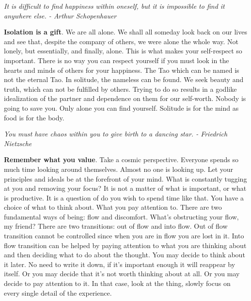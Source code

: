 \documentclass[a4paper,hidelinks]{article}
\begin{document}
\begin{center}
\textit{
It is difficult to find happiness within oneself, but it is impossible to find it anywhere else. - Arthur Schopenhauer
}
\end{center}

\textbf{Isolation is a gift}.
We are all alone.
We shall all someday look back on our lives and see that, despite the company of others, we were alone the whole way.
Not lonely, but essentially, and finally, alone.
This is what makes your self-respect so important.
There is no way you can respect yourself if you must look in the hearts and minds of others for your happiness.
The Tao which can be named is not the eternal Tao.
In solitude, the nameless can be found.
We seek beauty and truth, which can not be fulfilled by others.
Trying to do so results in a godlike idealization of the partner and dependence on them for our self-worth.
Nobody is going to save you.
Only alone you can find yourself.
Solitude is for the mind as food is for the body.

\newpage

\begin{center}
\textit{
You must have chaos within you to give birth to a dancing star. - Friedrich Nietzsche
}
\end{center}

\textbf{Remember what you value}.
Take a cosmic perspective.
Everyone spends so much time looking around themselves.
Almost no one is looking up.
Let your principles and ideals be at the forefront of your mind.
What is constantly tugging at you and removing your focus?
It is not a matter of what is important, or what is productive.
It is a question of do you wish to spend time like that.
You have a choice of what to think about.
What you pay attention to.
There are two fundamental ways of being: flow and discomfort.
What's obstructing your flow, my friend?
There are two transitions: out of flow and into flow.
Out of flow transition cannot be controlled since when you are in flow you are lost in it.
Into flow transition can be helped by paying attention to what you are thinking about and then deciding what to do about the thought.
You may decide to think about it later.
No need to write it down, if it's important enough it will reappear by itself.
Or you may decide that it's not worth thinking about at all.
Or you may decide to pay attention to it.
In that case, look at the thing, slowly focus on every single detail of the experience.

\newpage
\end{document}
